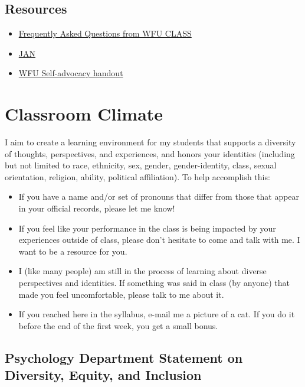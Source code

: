 \hypertarget{resources}{%
\section{Resources}\label{resources}}

\begin{itemize}
\tightlist
\item
  \href{https://class.wfu.edu/frequently-asked-questions-about-lac-ds/}{Frequently Asked Questions from WFU CLASS}
\item
  \href{https://askjan.org/}{JAN}
\item
  \href{https://docs.google.com/document/d/1X44zJyTz8-s9t6IXw0bII2DCFiOk1NR2MRfTi8wBiIc/}{WFU Self-advocacy handout}
\end{itemize}

\hypertarget{classroom-climate}{%
\chapter{Classroom Climate}\label{classroom-climate}}

I aim to create a learning environment for my students that supports a diversity of thoughts, perspectives, and experiences, and honors your identities (including but not limited to race, ethnicity, sex, gender, gender-identity, class, sexual orientation, religion, ability, political affiliation). To help accomplish this:

\begin{itemize}
\item
  If you have a name and/or set of pronouns that differ from those that appear in your official records, please let me know!
\item
  If you feel like your performance in the class is being impacted by your experiences outside of class, please don't hesitate to come and talk with me. I want to be a resource for you.
\item
  I (like many people) am still in the process of learning about diverse perspectives and identities. If something was said in class (by anyone) that made you feel uncomfortable, please talk to me about it.
\item
  If you reached here in the syllabus, e-mail me a picture of a cat. If you do it before the end of the first week, you get a small bonus.
\end{itemize}

\hypertarget{psychology-department-statement-on-diversity-equity-and-inclusion}{%
\section{Psychology Department Statement on Diversity, Equity, and Inclusion}\label{psychology-department-statement-on-diversity-equity-and-inclusion}}

